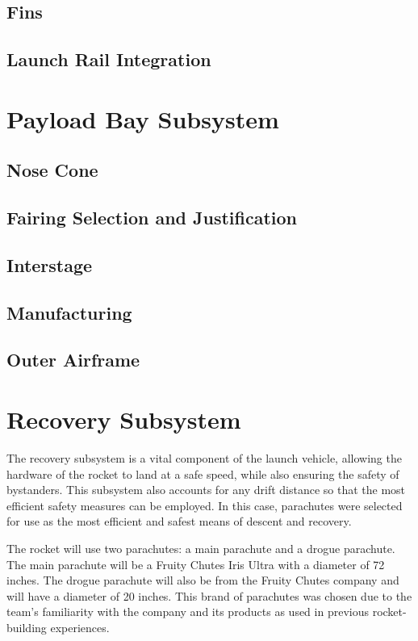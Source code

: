     \subsection{Fins}


    \subsection{Launch Rail Integration}
    
\section{Payload Bay Subsystem}

    \subsection{Nose Cone}
    
    \subsection{Fairing Selection and Justification}
    
    \subsection{Interstage}
    
    \subsection{Manufacturing}
    
    \subsection{Outer Airframe}
    
\section{Recovery Subsystem}
The recovery subsystem is a vital component of the launch vehicle, allowing the hardware of the rocket to land at a safe speed, while also ensuring the safety of bystanders. This subsystem also accounts for any drift distance so that the most efficient safety measures can be employed. In this case, parachutes were selected for use as the most efficient and safest means of descent and recovery.

The rocket will use two parachutes: a main parachute and a drogue parachute. The main parachute will be a Fruity Chutes Iris Ultra with a diameter of 72 inches. The drogue parachute will also be from the Fruity Chutes company and will have a diameter of 20 inches. This brand of parachutes was chosen due to the team’s familiarity with the company and its products as used in previous rocket-building experiences.


